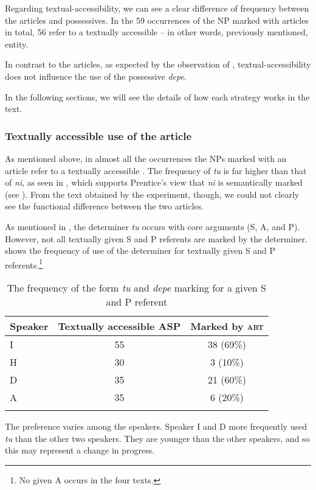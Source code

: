 \documentclass[output=paper
,modfonts
,nonflat]{langsci/langscibook}
\begin{document}
Regarding textual-accessibility, we can see a clear difference of frequency between the articles and possessives. In the 59 occurrences of the NP marked with articles in total, 56 refer to a textually accessible – in other words, previously mentioned, entity.

In contrast to the articles, as expected by the observation of , textual-accessibility does not influence the use of the possessive \textit{depe}. 

In the following sections, we will see the details of how each strategy works in the text.

\subsubsection{\label{s4.2.2}Textually accessible use of the article}

As mentioned above, in almost all the occurrences the NPs marked with an article refer to a textually accessible . The frequency of \textit{tu} is far higher than that of \textit{ni}, as seen in , which supports Prentice’s view that \textit{ni} is semantically marked (see ). From the text obtained by the experiment, though, we could not clearly see the functional difference between the two articles.

As mentioned in , the determiner \textit{tu} occurs with core arguments (S, A, and P). However, not all textually given S and P referents are marked by the determiner.  shows the frequency of use of the determiner for textually given S and P referents.\footnote{No given A occurs in the four texts.}

\begin{table}
	\begin{tabularx}{.8\textwidth}{Xcc}
		\lsptoprule
		Speaker & Textually accessible ASP & Marked by \textsc{art}\\
		\midrule
		I & 55 & 38 (69\%)\\
		H & 30 & 3 (10\%)\\
		D & 35 & 21 (60\%)\\
		A & 35 & 6 (20\%)\\
		\lspbottomrule
	\end{tabularx}
	\caption{The frequency of the form \textit{tu} and \textit{depe} marking for a given S and P referent}
	\label{tab:7}
\end{table}

\noindent
The preference varies among the speakers. Speaker I and D more frequently used \textit{tu} than the other two speakers. They are younger than the other speakers, and so this may represent a change in progress.
\end{document}
